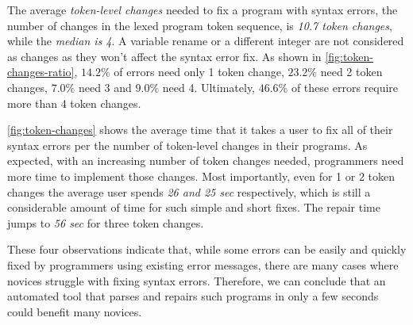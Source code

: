 %
The average \emph{token-level changes} needed to fix a program with syntax
errors, \ie the number of changes in the lexed program token sequence, is
\emph{10.7 token changes}, while the \emph{median is 4}.
%
A variable rename or a different integer are not considered as changes
as they won't affect the syntax error fix.
%
As shown in \autoref{fig:token-changes-ratio}, $14.2\%$ of errors
need only 1 token change, $23.2\%$ need 2 token changes, $7.0\%$
need 3 and $9.0\%$ need 4. 
Ultimately, $46.6\%$ of these errors require more than 4 token changes. 
%

%
\autoref{fig:token-changes} shows the average time that it takes a user to fix
all of their syntax errors per the number of token-level changes in their
programs. As expected, with an increasing number of token changes needed,
programmers need more time to implement those changes. Most importantly, even
for 1 or 2 token changes the average user spends \emph{26 and 25 sec}
respectively, which is still a considerable amount of time for such simple and
short fixes. The repair time jumps to \emph{56 sec} for three token changes.

\smallskip
These four observations indicate that, while some errors can be
easily and quickly fixed by programmers using existing error messages, 
there are many cases where novices struggle with fixing syntax errors.
%
Therefore, we can conclude that an automated tool that parses and repairs
such programs in only a few seconds could benefit many novices.
